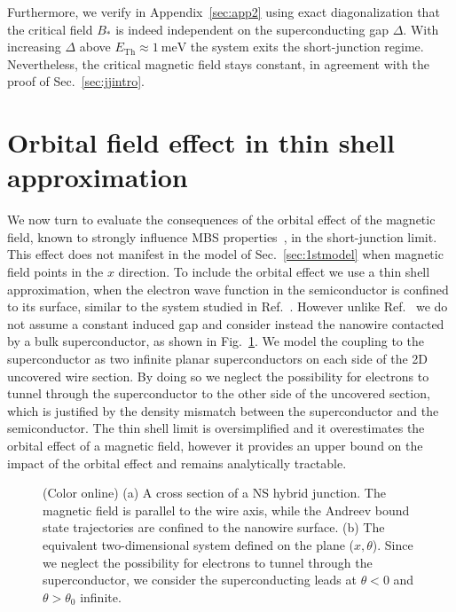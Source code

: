Furthermore, we verify in Appendix~\ref{sec:app2} using exact diagonalization that the critical field $B_*$ is indeed independent on the superconducting gap $\Delta$.
With increasing $\Delta$ above $E_\mathrm{Th}\approx \SI{1}{\meV}$ the system exits the short-junction regime. Nevertheless, the critical magnetic field stays constant, in agreement with the proof of Sec.~\ref{sec:jjintro}.

\section{Orbital field effect in thin shell approximation}
\label{sec:orb}

We now turn to evaluate the consequences of the orbital effect of the magnetic field, known to strongly influence MBS properties~\cite{Lim2013, Osca2014b, Osca2015, Nijholt2016}, in the short-junction limit.
This effect does not manifest in the model of Sec.~\ref{sec:1stmodel} when magnetic field points in the $x$ direction.
To include the orbital effect we use a thin shell approximation, when the electron wave function in the semiconductor is confined to its surface, similar to the system studied in Ref.~\cite{Osca2014b}.
However unlike Ref.~\cite{Osca2014b} we do not assume a constant induced gap and consider instead the nanowire contacted by a bulk superconductor, as shown in Fig.~\ref{fig:orb}.
We model the coupling to the superconductor as two infinite planar superconductors on each side of the 2D uncovered wire section.
By doing so we neglect the possibility for electrons to tunnel through the superconductor to the other side of the uncovered section, which is justified by the density mismatch between the superconductor and the semiconductor.
The thin shell limit is oversimplified and it overestimates the orbital effect of a magnetic field, however it provides an upper bound on the impact of the orbital effect and remains analytically tractable.

\begin{figure}[tb]
\caption{(Color online) (a) A cross section of a NS hybrid junction. The magnetic field is parallel to the wire axis, while the Andreev bound state trajectories are confined to the nanowire surface.
(b) The equivalent two-dimensional system defined on the plane ($x,\theta$).
Since we neglect the possibility for electrons to tunnel through the superconductor, we consider the superconducting leads at $\theta<0$ and $\theta>\theta_0$ infinite.
\label{fig:orb}
}
\end{figure}

